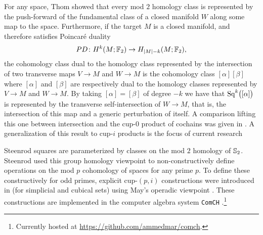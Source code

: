 \begin{remark}
	For any space, Thom showed that every mod $2$ homology class is represented by the push-forward of the fundamental class of a closed manifold $W$ along some map to the space.
	Furthermore, if the target $M$ is a closed manifold, and therefore satisfies Poincar\'{e} duality
	\[
	PD \colon H^k(M ;{\mathbb{F}_2}) \to H_{\lvert M\rvert-k}(M; {\mathbb{F}_2}),
	\]
	the cohomology class dual to the homology class represented by the intersection of two transverse maps $V \to M$ and $W \to M$ is the cohomology class $[\alpha] [\beta]$ where $[\alpha]$ and $[\beta]$ are respectively dual to the homology classes represented by $V \to M$ and $W \to M$.
	By taking $[\alpha] = [\beta]$ of degree $-k$ we have that $\mathrm{Sq}^k \big( [\alpha] \big)$ is represented by the transverse self-intersection of $W \to M$, that is, the intersection of this map and a generic perturbation of itself.
	A comparison lifting this one between intersection and the cup-$0$ product of cochains was given in \cite{medina2021flowing}.
	A generalization of this result to \mbox{cup-$i$} products is the focus of current research \cite{medina2022foundations}
\end{remark}

\begin{remark}
	Steenrod squares are parameterized by classes on the mod $2$ homology of $\mathbb{S}_2$.
	Steenrod used this group homology viewpoint to non-constructively define operations on the mod $p$ cohomology of spaces \cite{steenrod1952reduced, steenrod1953cyclic, steenrod1962cohomology} for any prime $p$.
	To define these constructively for odd primes, explicit cup-$(p,i)$ constructions were introduced in \cite{medina2021may_st} (for simplicial and cubical sets) using May's operadic viewpoint \cite{may1970general}.
	These constructions are implemented in the computer algebra system \texttt{ComCH} \cite{medina2021comch}.\footnote{Currently hosted at \url{https://github.com/ammedmar/comch}.}
\end{remark}